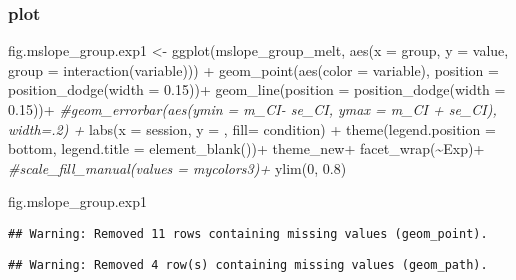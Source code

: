 \documentclass[
]{article}
\newenvironment{Shaded}{\begin{snugshade}}{\end{snugshade}}
\newcommand{\AttributeTok}[1]{\textcolor[rgb]{0.77,0.63,0.00}{#1}}
\newcommand{\CommentTok}[1]{\textcolor[rgb]{0.56,0.35,0.01}{\textit{#1}}}
\newcommand{\DecValTok}[1]{\textcolor[rgb]{0.00,0.00,0.81}{#1}}
\newcommand{\FloatTok}[1]{\textcolor[rgb]{0.00,0.00,0.81}{#1}}
\newcommand{\FunctionTok}[1]{\textcolor[rgb]{0.00,0.00,0.00}{#1}}
\newcommand{\NormalTok}[1]{#1}
\newcommand{\OtherTok}[1]{\textcolor[rgb]{0.56,0.35,0.01}{#1}}
\newcommand{\SpecialCharTok}[1]{\textcolor[rgb]{0.00,0.00,0.00}{#1}}
\newcommand{\StringTok}[1]{\textcolor[rgb]{0.31,0.60,0.02}{#1}}
\begin{document}
\hypertarget{plot}{%
\subsubsection{plot}\label{plot}}

\begin{Shaded}
\begin{Highlighting}[]
\NormalTok{fig.mslope\_group.exp1 }\OtherTok{\textless{}{-}} \FunctionTok{ggplot}\NormalTok{(mslope\_group\_melt, }\FunctionTok{aes}\NormalTok{(}\AttributeTok{x =}\NormalTok{ group, }\AttributeTok{y =}\NormalTok{ value, }\AttributeTok{group =} \FunctionTok{interaction}\NormalTok{(variable))) }\SpecialCharTok{+}
  \FunctionTok{geom\_point}\NormalTok{(}\FunctionTok{aes}\NormalTok{(}\AttributeTok{color =}\NormalTok{ variable), }\AttributeTok{position =} \FunctionTok{position\_dodge}\NormalTok{(}\AttributeTok{width =} \FloatTok{0.15}\NormalTok{))}\SpecialCharTok{+}
  \FunctionTok{geom\_line}\NormalTok{(}\AttributeTok{position =} \FunctionTok{position\_dodge}\NormalTok{(}\AttributeTok{width =} \FloatTok{0.15}\NormalTok{))}\SpecialCharTok{+}
  \CommentTok{\#geom\_errorbar(aes(ymin = m\_CI{-} se\_CI, ymax = m\_CI + se\_CI), width=.2) +}
  \FunctionTok{labs}\NormalTok{(}\AttributeTok{x =} \StringTok{\textquotesingle{}session\textquotesingle{}}\NormalTok{, }\AttributeTok{y =} \StringTok{\textquotesingle{} \textquotesingle{}}\NormalTok{, }\AttributeTok{fill=} \StringTok{\textquotesingle{}condition\textquotesingle{}}\NormalTok{) }\SpecialCharTok{+}
  \FunctionTok{theme}\NormalTok{(}\AttributeTok{legend.position =} \StringTok{\textquotesingle{}bottom\textquotesingle{}}\NormalTok{, }\AttributeTok{legend.title =} \FunctionTok{element\_blank}\NormalTok{())}\SpecialCharTok{+}
\NormalTok{  theme\_new}\SpecialCharTok{+}
  \FunctionTok{facet\_wrap}\NormalTok{(}\SpecialCharTok{\textasciitilde{}}\NormalTok{Exp)}\SpecialCharTok{+}
  \CommentTok{\#scale\_fill\_manual(values = mycolors3)+}
  \FunctionTok{ylim}\NormalTok{(}\DecValTok{0}\NormalTok{, }\FloatTok{0.8}\NormalTok{)}

\NormalTok{fig.mslope\_group.exp1}
\end{Highlighting}
\end{Shaded}

\begin{verbatim}
## Warning: Removed 11 rows containing missing values (geom_point).
\end{verbatim}

\begin{verbatim}
## Warning: Removed 4 row(s) containing missing values (geom_path).
\end{verbatim}
\end{document}
